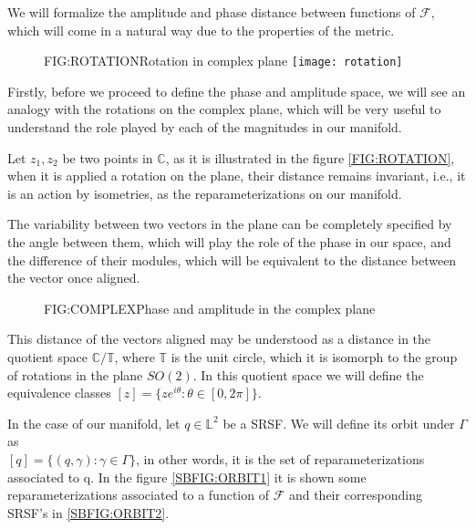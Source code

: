 
We will formalize the amplitude and phase distance between functions of
$\mathcal{F}$, which will come in a natural way due to the properties of the
metric.

\begin{figure}[Rotation in complex plane]{FIG:ROTATION}{Rotation in complex plane}
	\texttt{[image: rotation]}
\end{figure}

Firstly, before we proceed to define the phase and amplitude space, we will see
an analogy with the rotations on the complex plane, which will be very useful to
understand the role played by each of the magnitudes in our manifold.

Let  $z_1, z_2$ be two points in $\mathbb{C}$, as it is illustrated in the
figure \ref{FIG:ROTATION}, when it is applied a rotation on the plane, their
distance remains invariant, i.e., it is an action by isometries, as the
reparameterizations on our manifold.


The variability between two vectors in the plane can be completely specified by
the angle between them, which will play the role of the phase in our space, and
the difference of their modules, which will be equivalent to the distance
between the vector once aligned.

\begin{figure}[Phase and amplitude in the complex plane]{FIG:COMPLEX}{Phase and amplitude in the complex plane}

 \qquad
{}

\end{figure}


This distance of the vectors aligned may be understood as a distance in the
quotient space $\mathbb{C} / \mathbb{T}$, where $\mathbb{T}$ is the unit circle,
which it is isomorph to the group of rotations in the plane $SO(2)$. In this
quotient space we will define the equivalence classes
$[z] = \{z e^{i \theta} : \theta \in [0, 2\pi]\}$.

In the case of our manifold, let $q \in \mathbb{L}^2$ be a SRSF. We will define
its orbit under $\Gamma$ as \\$[q] = \{(q, \gamma) : \gamma \in \Gamma \}$, in
other words, it is the set of reparameterizations associated to q. In the
figure \ref{SBFIG:ORBIT1} it is shown some reparameterizations associated  to a function
of $\mathscr{F}$ and their corresponding SRSF's in \ref{SBFIG:ORBIT2}.


